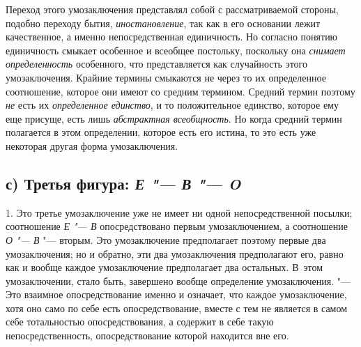 {{Переход этого умозаключения представлял собой с
рассматриваемой стороны, подобно переходу бытия, {\em иностановление},
так как в его основании лежит качественное, а именно
непосредственная единичность. Но согласно понятию единичность смыкает
особенное и всеобщее постольку, поскольку она
{\em снимает определенность}
особенного, что представляется как случайность этого
умозаключения. Крайние термины смыкаются не через то их определенное
соотношение, которое они имеют со средним термином. Средний термин поэтому
{\em не} есть их
{\em определенное единство},
и то положительное единство, которое ему еще присуще, есть
лишь {\em абстрактная всеобщность}.
Но когда средний термин полагается в этом определении,
которое есть его истина, то это есть уже некоторая другая форма
умозаключения.

\subsection[с) Третья фигура]
{с) Третья фигура: {\em Е "--- В "--- O}}

1. Это третье умозаключение уже не имеет ни одной
непосредственной посылки; соотношение {\em Е "--- В}
опосредствовано первым умозаключением, а соотношение
{\em О "--- В} "--- вторым. Это умозаключение предполагает поэтому первые два
умозаключения; но и обратно, эти два умозаключения предполагают его, равно
как и вообще каждое умозаключение предполагает два остальных. В~этом
умозаключении, стало быть, завершено вообще определение умозаключения.
"--- Это взаимное опосредствование именно и означает, что каждое
умозаключение, хотя оно само по себе есть опосредствование, вместе с тем не
является в самом себе тотальностью опосредствования, а содержит в себе
такую непосредственность, опосредствование которой находится вне его.

}}
